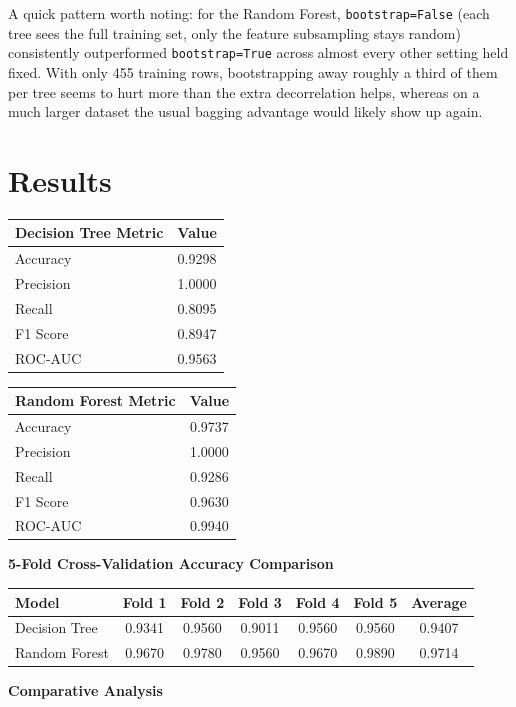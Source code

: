 \documentclass[12pt,a4paper]{article}
\begin{document}
A quick pattern worth noting: for the Random Forest, \texttt{bootstrap=False} (each tree sees the
full training set, only the feature subsampling stays random) consistently outperformed
\texttt{bootstrap=True} across almost every other setting held fixed. With only 455 training rows,
bootstrapping away roughly a third of them per tree seems to hurt more than the extra
decorrelation helps, whereas on a much larger dataset the usual bagging advantage would likely show
up again.

\section{Results}

\begin{tabular}{lc}
\toprule
Decision Tree Metric & Value \\
\midrule
Accuracy & 0.9298 \\
Precision & 1.0000 \\
Recall & 0.8095 \\
F1 Score & 0.8947 \\
ROC-AUC & 0.9563 \\
\bottomrule
\end{tabular}
\hspace{1cm}
\begin{tabular}{lc}
\toprule
Random Forest Metric & Value \\
\midrule
Accuracy & 0.9737 \\
Precision & 1.0000 \\
Recall & 0.9286 \\
F1 Score & 0.9630 \\
ROC-AUC & 0.9940 \\
\bottomrule
\end{tabular}

\vspace{0.3cm}
\textbf{5-Fold Cross-Validation Accuracy Comparison}

\begin{tabular}{lcccccc}
\toprule
Model & Fold 1 & Fold 2 & Fold 3 & Fold 4 & Fold 5 & Average \\
\midrule
Decision Tree & 0.9341 & 0.9560 & 0.9011 & 0.9560 & 0.9560 & 0.9407 \\
Random Forest & 0.9670 & 0.9780 & 0.9560 & 0.9670 & 0.9890 & 0.9714 \\
\bottomrule
\end{tabular}

\vspace{0.3cm}
\textbf{Comparative Analysis}
\end{document}
